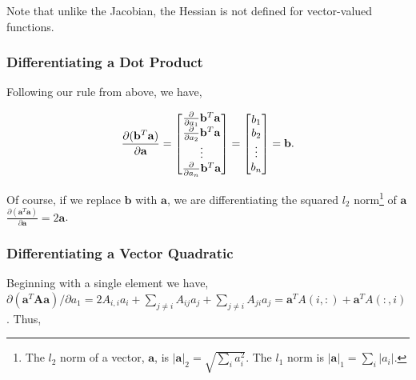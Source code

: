 \documentclass[11pt]{amsart}
\begin{document}
Note that unlike the Jacobian, the Hessian is not defined for vector-valued functions.

\subsubsection{Differentiating a Dot Product}

Following our rule from above, we have,

\begin{align}
\frac{\partial(\mathbf{b}^T\mathbf{a})}{\partial\mathbf{a}} =
\begin{bmatrix}
\frac{\partial}{\partial a_1} \mathbf{b}^T\mathbf{a} \\
\frac{\partial}{\partial a_2} \mathbf{b}^T\mathbf{a} \\
\vdots \\
\frac{\partial}{\partial a_n} \mathbf{b}^T\mathbf{a} \\
\end{bmatrix}
= 
\begin{bmatrix}
b_1 \\
b_2 \\
\vdots \\
b_n \\
\end{bmatrix}
= \mathbf{b} \notag.
\end{align}

Of course, if we replace $\mathbf{b}$ with $\mathbf{a}$, we are differentiating the squared $l_2$ norm\footnote{The $l_2$ norm of a vector, $\mathbf{a}$, is $|\mathbf{a}|_2 = \sqrt{\sum_i a_i^2}$. The $l_1$ norm is $|\mathbf{a}|_1 = \sum_i |a_i|$.} of $\mathbf{a}$ $\frac{\partial(\mathbf{a}^T\mathbf{a})}{\partial\mathbf{a}} = 2\mathbf{a}$.

\subsubsection{Differentiating a Vector Quadratic}

Beginning with a single element we have, $\partial(\mathbf{a}^T\mathbf{A}\mathbf{a})/\partial a_1 = 2A_{i, i}a_i + \sum_{j \neq i} A_{ij}a_j + \sum_{j \neq i} A_{ji}a_j = \mathbf{a}^TA(i, :) + \mathbf{a}^TA(:, i)$. Thus,
\end{document}
